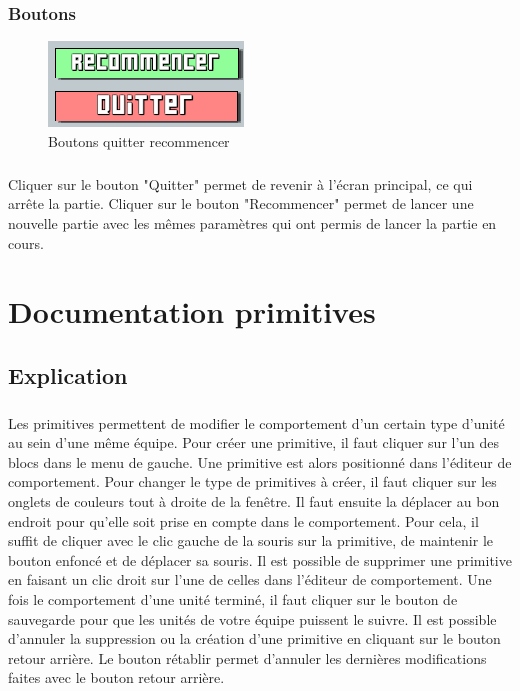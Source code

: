 \documentclass{report}
\begin{document}
\subsection{Boutons}
\begin{figure}[!h]
	\centering
		\includegraphics[scale=0.80]{quitter.png}
	\caption{Boutons quitter recommencer}
\end{figure}
\paragraph{}
Cliquer sur le bouton "Quitter" permet de revenir à l'écran principal, ce qui arrête la partie. \newline
Cliquer sur le bouton "Recommencer" permet de lancer une nouvelle partie avec les mêmes paramètres qui ont permis de lancer la partie en cours.

\chapter{Documentation primitives}
\section{Explication}
\paragraph{}
Les primitives permettent de modifier le comportement d'un certain type d'unité au sein d'une même équipe. Pour créer une primitive, il faut cliquer sur l'un des blocs dans le menu de gauche. Une primitive est alors positionné dans l'éditeur de comportement. \newline
Pour changer le type de primitives à créer, il faut cliquer sur les onglets de couleurs tout à droite de la fenêtre. \newline
Il faut ensuite la déplacer au bon endroit pour qu'elle soit prise en compte dans le comportement. Pour cela, il suffit de cliquer avec le clic gauche de la souris sur la primitive, de maintenir le bouton enfoncé et de déplacer sa souris. \newline
Il est possible de supprimer une primitive en faisant un clic droit sur l'une de celles dans l'éditeur de comportement.\newline
Une fois le comportement d'une unité terminé, il faut cliquer sur le bouton de sauvegarde pour que les unités de votre équipe puissent le suivre. \newline
Il est possible d'annuler la suppression ou la création d'une primitive en cliquant sur le bouton retour arrière.  \newline
Le bouton rétablir permet d'annuler les dernières modifications faites avec le bouton retour arrière.
\end{document}
